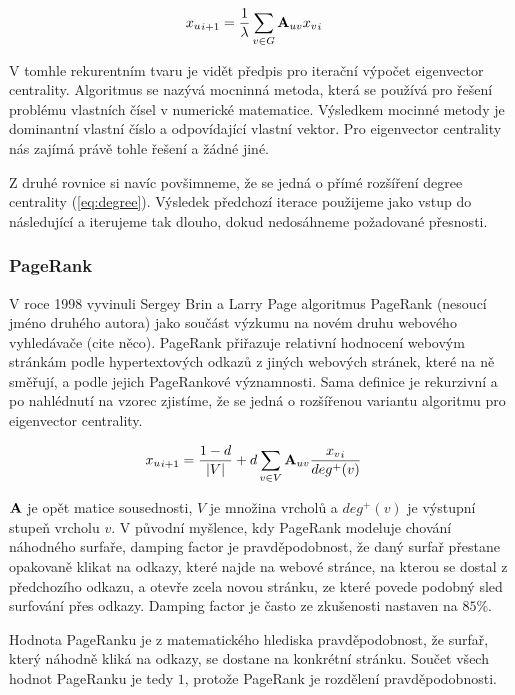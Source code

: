 \documentclass[12pt,titlepage]{report}
\begin{document}
\begin{align} 
{x_u}_{i + 1} &=  \frac{1}{\lambda} \displaystyle\sum_{v \in G} {\bf A}_{uv}
{x_v}_{i}
\end{align} 

V tomhle rekurentním tvaru je vidět předpis pro iterační výpočet eigenvector
centrality. Algoritmus se nazývá mocninná metoda, která se používá pro řešení
problému vlastních čísel v numerické matematice. Výsledkem mocinné metody je
dominantní vlastní číslo a odpovídající vlastní vektor. Pro eigenvector
centrality nás zajímá právě tohle řešení a žádné jiné.

Z druhé rovnice si navíc povšimneme, že se jedná o přímé rozšíření degree
centrality (\ref{eq:degree}). Výsledek předchozí iterace použijeme jako vstup
do následující a iterujeme tak dlouho, dokud nedosáhneme požadované přesnosti.

\subsubsection{PageRank}
V roce 1998 vyvinuli Sergey Brin a Larry Page algoritmus PageRank (nesoucí
jméno druhého autora) jako součást výzkumu na novém druhu webového vyhledávače
(cite něco). PageRank přiřazuje relativní hodnocení webovým stránkám podle
hypertextových odkazů z jiných webových stránek, které na ně směřují, a podle
jejich PageRankové významnosti. Sama definice je rekurzivní a po nahlédnutí na
vzorec zjistíme, že se jedná o rozšířenou variantu algoritmu pro eigenvector
centrality.

\begin{align}
{x_u}_{i + 1} &= \frac{1 - d}{|V|} + d \displaystyle\sum_{v \in V} {\bf A}_{uv}
\frac{{x_v}_{i}}{deg^+ (v)}
\end{align}

${\bf A}$ je opět matice sousednosti, $V$ je množina vrcholů a $deg^+(v)$ je
výstupní stupeň vrcholu $v$.  V původní myšlence, kdy PageRank modeluje chování
náhodného surfaře, damping factor je pravděpodobnost, že daný surfař přestane
opakovaně klikat na odkazy, které najde na webové stránce, na kterou se dostal
z předchozího odkazu, a otevře zcela novou stránku, ze které povede podobný
sled surfování přes odkazy.  Damping factor je často ze zkušenosti nastaven na
$85\%$.

Hodnota PageRanku je z matematického hlediska pravděpodobnost, že surfař, který
náhodně kliká na odkazy, se dostane na konkrétní stránku. Součet všech hodnot
PageRanku je tedy $1$, protože PageRank je rozdělení pravděpodobnosti.
\end{document}
